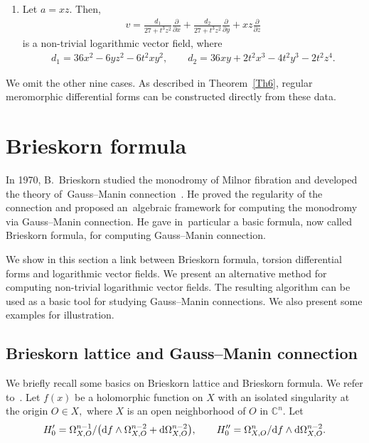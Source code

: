 \documentclass[pdftex]{sigma}%
\numberwithin{equation}{section}
\begin{document}
\begin{Example}
\begin{enumerate}
\item[$(ii)$] Let $ a=xz$. Then,
\begin{gather*}
v=\frac{d_1}{27+t^3z^2}\frac{\partial}{\partial x} +\frac{d_2}{27+t^3z^2}\frac{\partial}{\partial y} +xz\frac{\partial}{\partial z}
\end{gather*}
is a non-trivial logarithmic vector field, where
\begin{gather*}
d_1=36x^2-6yz^2-6t^2xy^2, \qquad d_2=36xy+2t^2x^3-4t^2y^3-2t^2z^4.
\end{gather*}
\end{enumerate}
We omit the other nine cases. As described in Theorem~\ref{Th6}, regular meromorphic differential forms can be constructed directly from these data.
\end{Example}

\section{Brieskorn formula}\label{sec5}

In 1970, B.~Brieskorn studied the monodromy of Milnor fibration and developed the theory of~Gauss--Manin connection~\cite{Br}. He proved the regularity of the connection and proposed an~alge\-braic framework for computing the monodromy via Gauss--Manin connection. He gave in~particular a basic formula, now called Brieskorn formula, for computing Gauss--Manin connection.

We show in this section a link between Brieskorn formula, torsion differential forms and logarithmic vector fields. We present an alternative method for computing non-trivial logarithmic vector fields. The resulting algorithm can be used as a basic tool for studying Gauss--Manin connections. We also present some examples for illustration.

\subsection{Brieskorn lattice and Gauss--Manin connection}

We briefly recall some basics on Brieskorn lattice and Brieskorn formula. We refer to~\cite{BS, Br, Schu}.
Let $f(x) $ be a holomorphic function on $X$ with an isolated singularity at the origin $ O \in X, $ where $X$ is an open neighborhood of $ O $ in $ {\mathbb C}^n$.
Let
\begin{gather*}
H_{0}^{\prime} = \Omega_{X, O}^{n-1}/\big({\rm d}f\wedge \Omega_{X,O}^{n-2} + {\rm d} \Omega_{X,O}^{n-2}\big), \qquad H_{0}^{\prime\prime}=\Omega_{X,O}^{n}/{\rm d}f\wedge {\rm d}\Omega_{X,O}^{n-2}.
\end{gather*}
\end{document}
